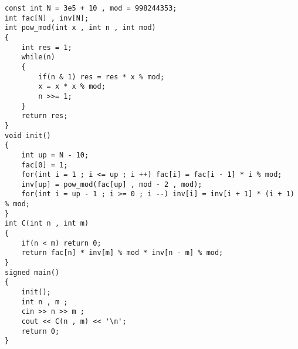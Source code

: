 \documentclass[E:/GsjzTle/main/main.tex]{subfiles}
\begin{document}
\begin{lstlisting}
const int N = 3e5 + 10 , mod = 998244353;
int fac[N] , inv[N];
int pow_mod(int x , int n , int mod)
{
	int res = 1;
	while(n)
	{
		if(n & 1) res = res * x % mod;
		x = x * x % mod;
		n >>= 1;
	}
	return res;
}
void init()
{
	int up = N - 10;
	fac[0] = 1;
	for(int i = 1 ; i <= up ; i ++) fac[i] = fac[i - 1] * i % mod;
	inv[up] = pow_mod(fac[up] , mod - 2 , mod);
	for(int i = up - 1 ; i >= 0 ; i --) inv[i] = inv[i + 1] * (i + 1) % mod;
}
int C(int n , int m)
{
	if(n < m) return 0;
	return fac[n] * inv[m] % mod * inv[n - m] % mod;
}
signed main()
{
	init();
	int n , m ;
	cin >> n >> m ;
	cout << C(n , m) << '\n';
	return 0;
}
\end{lstlisting}
\end{document}
